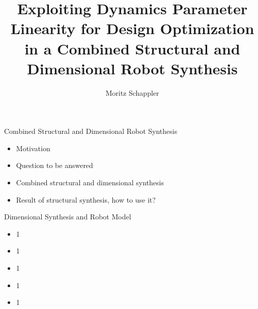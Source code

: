 \documentclass[c]{beamer}
\author[moritz.schappler@imes.uni-hannover.de]{Moritz Schappler}
\title{Exploiting Dynamics Parameter Linearity for Design Optimization in a Combined Structural and Dimensional Robot Synthesis}
\institute{Institute of Mechatronic Systems}
\newcommand{\postersubsection}[1]{%
\setlength\fboxsep{0pt}%
\vfil\penalty125\vfilneg\vskip1.5ex
\colorbox{Grau}{\parbox[b]{\columnwidth}{\vskip0.75ex%
\Large\hskip1ex #1%
\vskip0.75ex}}%
}
\begin{document}
\begin{frame}
\begin{block}{Combined Structural and Dimensional Robot Synthesis}
\parbox{\linewidth}{
\begin{multicols}{2}
\begin{itemize}
    \item Motivation
    \item Question to be answered
    \item Combined structural and dimensional synthesis
    \item Result of structural synthesis, how to use it?
\end{itemize}

\begin{figure}[t]
    \centering
	
\end{figure}




\end{multicols}}
\end{block}
\begin{whiteblock}{Dimensional Synthesis and Robot Model}
\parbox{\linewidth}{
\begin{multicols}{2}
\begin{itemize}
    \item 1
    \item 1
    \item 1
    \item 1
    \item 1
\end{itemize}
\begin{figure}[t]
    \centering
    
\end{figure}


\end{multicols}}
\end{whiteblock}
\end{frame}
\end{document}
